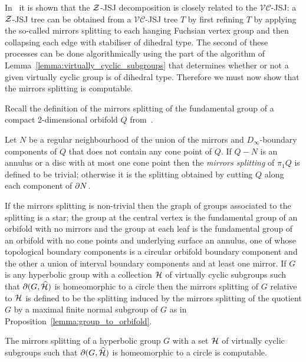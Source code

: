 In~\cite{dahmaniguirardel11} it is shown that the $\mathcal{Z}$-JSJ decomposition is closely related to the $\mathcal{VC}$-JSJ: a $\mathcal{Z}$-JSJ tree can be obtained from a $\mathcal{VC}$-JSJ tree $T$ by first refining $T$ by applying the so-called mirrors splitting to each hanging Fuchsian vertex group and then collapsing each edge with stabiliser of dihedral type.  
The second of these processes can be done algorithmically using the part of the algorithm of Lemma~\ref{lemma:virtually_cyclic_subgroups} that determines whether or not a given virtually cyclic group is of dihedral type. 
Therefore we must now show that the mirrors splitting is computable.%

Recall the definition of the mirrors splitting of the fundamental group of a compact 2-dimensional orbifold $Q$ from~\cite{dahmaniguirardel11}. 

\begin{definition} 
  Let $N$ be a regular neighbourhood of the union of the mirrors and $D_\infty$-boundary components of $Q$ that does not contain any cone point of $Q$. 
  If $Q - N$ is an annulus or a disc with at most one cone point then the \emph{mirrors splitting} of $\pi_1Q$ is defined to be trivial; otherwise it is the splitting obtained by cutting $Q$ along each component of $\partial N$. 
\end{definition}

If the mirrors splitting is non-trivial then the graph of groups associated to the splitting is a star; the group at the central vertex is the fundamental group of an orbifold with no mirrors and the group at each leaf is the fundamental group of an orbifold with no cone points and underlying surface an annulus, one of whose topological boundary components is a circular orbifold boundary component and the other a union of interval boundary components and at least one mirror. 
If $G$ is any hyperbolic group with a collection $\mathcal{H}$ of virtually cyclic subgroups such that $\partial(G, \widehat{\mathcal{H}})$ is homeomorphic to a circle then the mirrors splitting of $G$ relative to $\mathcal{H}$ is defined to be the splitting induced by the mirrors splitting of the quotient $G$ by a maximal finite normal subgroup of $G$ as in Proposition~\ref{lemma:group_to_orbifold}.

\begin{lemma} 
  The mirrors splitting of a hyperbolic group $G$ with a set $\mathcal{H}$ of virtually cyclic subgroups such that $\partial(G, \widehat{\mathcal{H}})$ is homeomorphic to a circle is computable.
\end{lemma}

